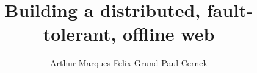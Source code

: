 \documentclass{article}
\title{Building a distributed, fault-tolerant, offline web}
\author{Arthur Marques \qquad Felix Grund \qquad Paul Cernek}
\begin{document}
\maketitle

\begin{abstract}

\end{abstract}

\section{}
\end{document}
